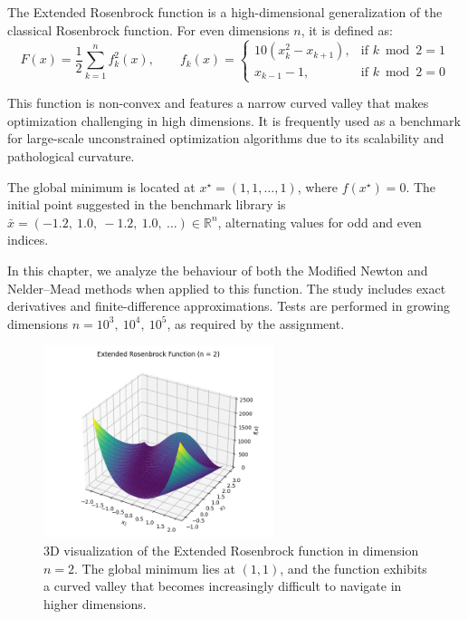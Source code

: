 \documentclass[a4paper,12pt]{article}
\begin{document}
	The Extended Rosenbrock function is a high-dimensional generalization of the classical Rosenbrock function. For even dimensions \( n \), it is defined as:
	\[
	F(x) = \frac{1}{2} \sum_{k=1}^{n} f_k^2(x), \qquad
	f_k(x) = 
	\begin{cases}
		10(x_k^2 - x_{k+1}), & \text{if } k \bmod 2 = 1 \\
		x_{k-1} - 1, & \text{if } k \bmod 2 = 0
	\end{cases}
	\]
	
	This function is non-convex and features a narrow curved valley that makes optimization challenging in high dimensions. It is frequently used as a benchmark for large-scale unconstrained optimization algorithms due to its scalability and pathological curvature.
	
	The global minimum is located at \( x^\star = (1, 1, \dots, 1) \), where \( f(x^\star) = 0 \). The initial point suggested in the benchmark library  is \\
	 \( \bar{x} = (-1.2,\ 1.0,\ -1.2,\ 1.0,\ \dots) \in \mathbb{R}^n \), alternating values for odd and even indices.
	
	In this chapter, we analyze the behaviour of both the Modified Newton and Nelder–Mead methods when applied to this function. The study includes exact derivatives and finite-difference approximations. Tests are performed in growing dimensions \( n = 10^3,\ 10^4,\ 10^5 \), as required by the assignment.
	
	\begin{figure}[htbp]
		\centering
		\includegraphics[width=0.6\textwidth]{../immagini/ext_rosen_3d.png}
		\caption{3D visualization of the Extended Rosenbrock function in dimension $n=2$. The global minimum lies at $(1,1)$, and the function exhibits a curved valley that becomes increasingly difficult to navigate in higher dimensions.}
		\label{fig:extrosen3d}
	\end{figure}
	
\end{document}
